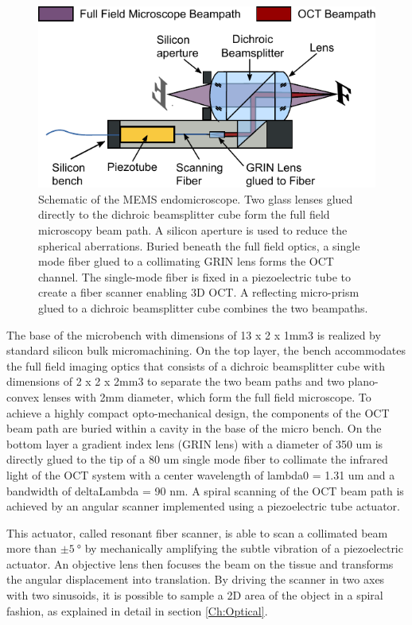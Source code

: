\begin{figure}[h!]\centering
      \includegraphics{figures/30_DesignSimulation/Overview/Schematic_paper.pdf}
      \caption{Schematic of the MEMS endomicroscope. Two glass lenses glued directly to the dichroic beamsplitter cube form the full field microscopy beam path. A silicon aperture is used to reduce the spherical aberrations. Buried beneath the full field optics, a single mode fiber glued to a collimating GRIN lens forms the OCT channel. The single-mode fiber is fixed in a piezoelectric tube to create a fiber scanner enabling 3D OCT. A reflecting micro-prism glued to a dichroic beamsplitter cube combines the two beampaths.}
      \label{fig:bimodalSketch}
\end{figure}

The base of the microbench with dimensions of 13 x 2 x 1mm3 is realized by standard silicon bulk micromachining. On the top layer, the bench accommodates the full field imaging optics that consists of a dichroic beamsplitter cube with dimensions of 2 x 2 x 2mm3 to separate the two beam paths and two plano-convex lenses with 2mm diameter, which form the full field microscope. To achieve a highly compact opto-mechanical design, the components of the OCT beam path are buried within a cavity in the base of the micro bench. On the bottom layer a gradient index lens (GRIN lens) with a diameter of 350 um is directly glued to the tip of a 80 um single mode fiber to collimate the infrared light of the OCT system with a center wavelength of lambda0 = 1.31 um and a bandwidth of deltaLambda = 90 nm. A spiral scanning of the OCT beam path
is achieved by an angular scanner implemented using a piezoelectric tube actuator.

This actuator, called resonant fiber scanner, is able to scan a collimated beam more than $\pm \SI{5}{\degree}$ by mechanically amplifying the subtle vibration of a piezoelectric actuator.  An objective lens then focuses the beam on the tissue and transforms the angular displacement into translation. By driving the scanner in two axes with two sinusoids, it is possible to sample a 2D area of the object in a spiral fashion, as explained in detail in section \ref{Ch:Optical}.

